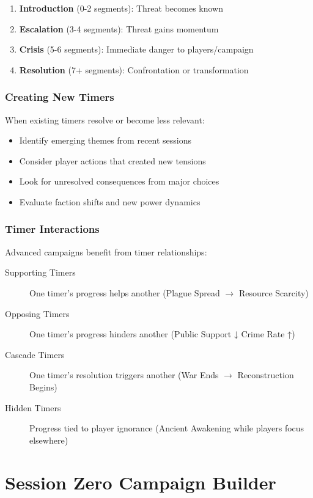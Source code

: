 \documentclass[11pt]{article}
\begin{document}
\begin{enumerate}
  \item \textbf{Introduction} (0-2 segments): Threat becomes known
  \item \textbf{Escalation} (3-4 segments): Threat gains momentum
  \item \textbf{Crisis} (5-6 segments): Immediate danger to players/campaign
  \item \textbf{Resolution} (7+ segments): Confrontation or transformation
\end{enumerate}

\subsubsection{Creating New Timers}

When existing timers resolve or become less relevant:

\begin{itemize}
  \item Identify emerging themes from recent sessions
  \item Consider player actions that created new tensions
  \item Look for unresolved consequences from major choices
  \item Evaluate faction shifts and new power dynamics
\end{itemize}

\subsubsection{Timer Interactions}

Advanced campaigns benefit from timer relationships:

\begin{description}
  \item[Supporting Timers] One timer's progress helps another (Plague Spread $\rightarrow$ Resource Scarcity)
  \item[Opposing Timers] One timer's progress hinders another (Public Support ↓ Crime Rate ↑)
  \item[Cascade Timers] One timer's resolution triggers another (War Ends $\rightarrow$ Reconstruction Begins)
  \item[Hidden Timers] Progress tied to player ignorance (Ancient Awakening while players focus elsewhere)
\end{description}

\section{Session Zero Campaign Builder}
\label{sec:sessionzero}
\end{document}
